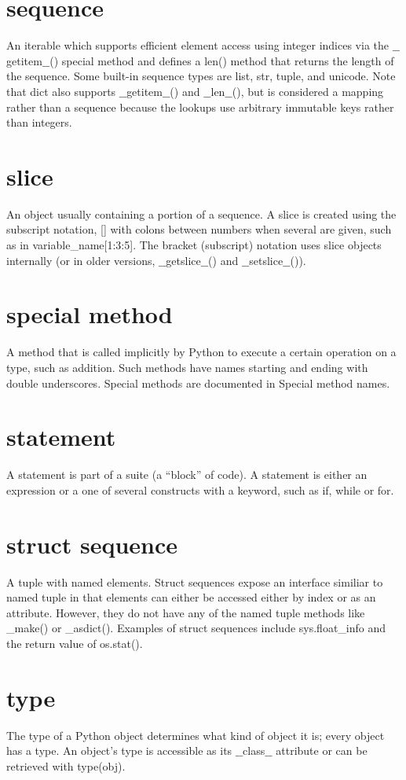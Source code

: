 \documentclass[12pt,a4paper,final,twoside,onecolumn,titlepage]{book}
\begin{document}
\section{sequence}
An iterable which supports efficient element access using integer indices via the $\_\_$getitem$\_\_$() special method and defines a len() method that returns the length of the sequence. Some built-in sequence types are list, str, tuple, and unicode. Note that dict also supports $\_\_$getitem$\_\_$() and $\_\_$len$\_\_$(), but is considered a mapping rather than a sequence because the lookups use arbitrary immutable keys rather than integers.
\section{slice}
An object usually containing a portion of a sequence. A slice is created using the subscript notation, [] with colons between numbers when several are given, such as in variable\_name[1:3:5]. The bracket (subscript) notation uses slice objects internally (or in older versions, $\_\_$getslice$\_\_$() and $\_\_$setslice$\_\_$()).
\section{special method}
A method that is called implicitly by Python to execute a certain operation on a type, such as addition. Such methods have names starting and ending with double underscores. Special methods are documented in Special method names.
\section{statement}
A statement is part of a suite (a “block” of code). A statement is either an expression or a one of several constructs with a keyword, such as if, while or for.
\section{struct sequence}
A tuple with named elements. Struct sequences expose an interface similiar to named tuple in that elements can either be accessed either by index or as an attribute. However, they do not have any of the named tuple methods like \_make() or \_asdict(). Examples of struct sequences include sys.float\_info and the return value of os.stat().

\section{type}
The type of a Python object determines what kind of object it is; every object has a type. An object’s type is accessible as its $\_\_$class$\_\_$ attribute or can be retrieved with type(obj).
\end{document}
